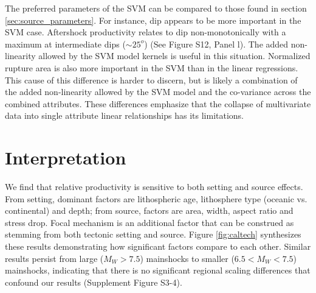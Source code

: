 \documentclass[draft, jgrga]{agujournal2018}
\begin{document}
The preferred parameters of the SVM can be compared to those found in section \ref{sec:source_parameters}. For instance, dip appears to be more important in the SVM case. Aftershock productivity relates to dip non-monotonically with a maximum at intermediate  dips ($\sim 25^o$) (See Figure S12, Panel l). The added non-linearity allowed by the SVM model kernels is useful in this situation. Normalized rupture area is also more important in the SVM than in the linear regressions. This cause of this difference is harder to discern, but is likely a combination of the added non-linearity allowed by the SVM model and the co-variance across the combined attributes. These differences emphasize that the collapse of multivariate data into single attribute linear relationships has its limitations.




\section{Interpretation}

We find that relative productivity is sensitive to both setting and source effects. From setting, dominant factors are lithospheric age, lithosphere type (oceanic vs. continental) and depth; from source, factors are area, width, aspect ratio and stress drop. Focal mechanism is an additional factor that can be construed as stemming from both tectonic setting and source. Figure \ref{fig:caltech} synthesizes these results demonstrating how significant factors compare to each other. Similar results persist from large ($M_W>7.5$) mainshocks to smaller ($6.5<M_W<7.5$) mainshocks, indicating that there is no significant regional scaling differences that confound our results (Supplement Figure S3-4).
\end{document}
